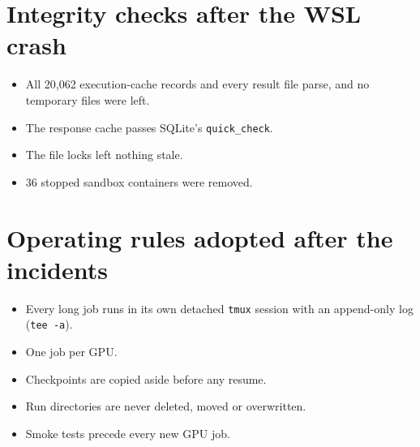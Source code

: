 \section*{Integrity checks after the WSL crash}
\begin{itemize}
\item All 20,062 execution-cache records and every result file parse, and no temporary files were left.
\item The response cache passes SQLite's \texttt{quick\_check}.
\item The file locks left nothing stale.
\item 36 stopped sandbox containers were removed.
\end{itemize}

\section*{Operating rules adopted after the incidents}
\begin{itemize}
\item Every long job runs in its own detached \texttt{tmux} session with an append-only log (\texttt{tee -a}).
\item One job per GPU.
\item Checkpoints are copied aside before any resume.
\item Run directories are never deleted, moved or overwritten.
\item Smoke tests precede every new GPU job.
\end{itemize}
